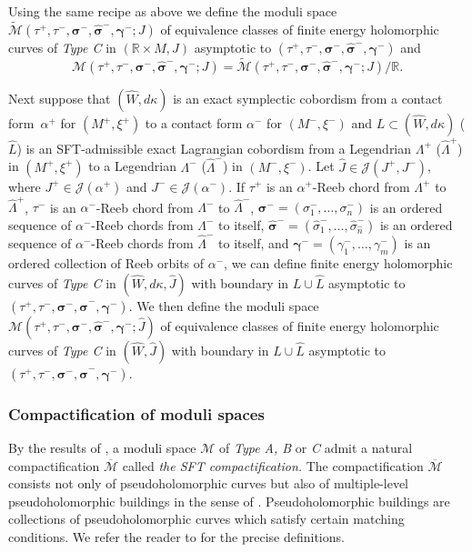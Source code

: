 \documentclass[10pt]{amsart}
\let\mathcal\mathscr
\theoremstyle{plain}
\theoremstyle{definition}
\numberwithin{equation}{subsection}
\newcommand{\RR}{\mathbb{R}}
\let\bs\boldsymbol
\begin{document}
Using the same recipe as above we define the moduli space $\widetilde{\mathcal{M}}(\tau^+\!,\tau^-\!,\bs\sigma^-\!,\widehat{\bs\sigma}^-\!,\bs\gamma^-;J)$ of equivalence classes of finite energy holomorphic curves of \emph{Type C} in $(\mathbb{R}\times M,J)$ asymptotic to $(\tau^+,\tau^-,\bs\sigma^-,\widehat{\bs\sigma}^-,\bs\gamma^-)$ and $${\mathcal{M}}(\tau^+,\tau^-,\bs\sigma^-,\widehat{\bs\sigma}^-,\bs\gamma^-;J)=\widetilde{\mathcal{M}}(\tau^+,\tau^-,\bs\sigma^-,\widehat{\bs\sigma}^-,\bs\gamma^-;J)/\RR.$$

Next suppose that $(\widehat W, d\kappa)$ is an exact symplectic cobordism from a contact form~$\alpha^+$ for $(M^+,\xi^+)$ to a contact form $\alpha^-$ for $(M^-,\xi^-)$ and $L \subset (\widehat W,d\kappa)$ (\resp $\widehat L$) is an SFT-admissible exact Lagrangian cobordism from a Legendrian $\Lambda^+$ (\resp $\widehat{\Lambda}^+$) in $(M^+,\xi^+)$ to a Legendrian $\Lambda^-$ (\resp $\widehat{\Lambda}^-$) in $(M^-,\xi^-)$. Let $\widehat{J}\in \mathcal{J}(J^+,J^-)$, where $J^+ \in \mathcal{J}(\alpha^+)$ and $J^- \in \mathcal{J}(\alpha^-)$. If $\tau^+$ is an $\alpha^+$-Reeb chord from $\Lambda^+$ to $\widehat{\Lambda}^+$, $\tau^-$ is an $\alpha^-$-Reeb chord from $\Lambda^-$ to $\widehat{\Lambda}^-$, $\bs\sigma^-=(\sigma^-_1,\dots,\sigma^-_n)$ is an ordered sequence of $\alpha^-$-Reeb chords from $\Lambda^-$ to itself, $\widehat{\bs\sigma}^-=(\widehat{\sigma}^-_1,\dots,\widehat{\sigma}^-_{\widehat{n}})$ is an ordered sequence of $\alpha^-$-Reeb chords from $\widehat{\Lambda}^-$ to itself, and $\bs\gamma^-=(\gamma^-_1,\dots,\gamma^-_m)$ is an ordered collection of Reeb orbits of $\alpha^-$, we can define finite energy holomorphic curves of \emph{Type C} in $(\widehat W,d\kappa, \widehat{J})$ with boundary in $L\cup \widehat{L}$ asymptotic to $(\tau^+,\tau^-,\bs\sigma^-,\widehat{\bs\sigma}^-,\bs\gamma^-)$.
We then define the moduli space ${\mathcal{M}}(\tau^+,\tau^-,\bs\sigma^-,\widehat{\bs\sigma}^-,\bs\gamma^-;\widehat{J})$ of equivalence classes of finite energy holomorphic curves of \emph{Type C} in $(\widehat W,\widehat{J})$ with boundary in $L\cup \widehat{L}$ asymptotic to $(\tau^+,\tau^-,\bs\sigma^-,\widehat{\bs\sigma}^-,\bs\gamma^-)$.

\subsubsection{Compactification of moduli spaces}

By the results of \cite{CPT}, a moduli space $\mathcal{M}$ of \emph{Type A, B} or \emph{C} admit a natural compactification $\overline{\mathcal{M}}$ called {\em the SFT compactification.} The compactification $\overline{\mathcal{M}}$ consists not only of pseudoholomorphic curves but also of multiple-level pseudoholomorphic buildings in the sense of \cite{CPT}. Pseudoholomorphic buildings are collections of pseudoholomorphic curves which satisfy certain matching conditions. We refer the reader to \cite{CPT} for the precise definitions.
\end{document}
